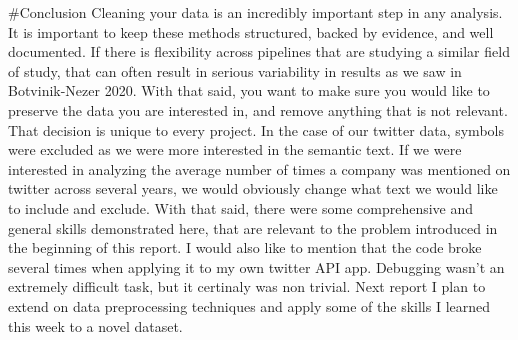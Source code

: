 \documentclass[
]{article}
\begin{document}
\#Conclusion Cleaning your data is an incredibly important step in any
analysis. It is important to keep these methods structured, backed by
evidence, and well documented. If there is flexibility across pipelines
that are studying a similar field of study, that can often result in
serious variability in results as we saw in Botvinik-Nezer 2020. With
that said, you want to make sure you would like to preserve the data you
are interested in, and remove anything that is not relevant. That
decision is unique to every project. In the case of our twitter data,
symbols were excluded as we were more interested in the semantic text.
If we were interested in analyzing the average number of times a company
was mentioned on twitter across several years, we would obviously change
what text we would like to include and exclude. With that said, there
were some comprehensive and general skills demonstrated here, that are
relevant to the problem introduced in the beginning of this report. I
would also like to mention that the code broke several times when
applying it to my own twitter API app. Debugging wasn't an extremely
difficult task, but it certinaly was non trivial. Next report I plan to
extend on data preprocessing techniques and apply some of the skills I
learned this week to a novel dataset.
\end{document}
